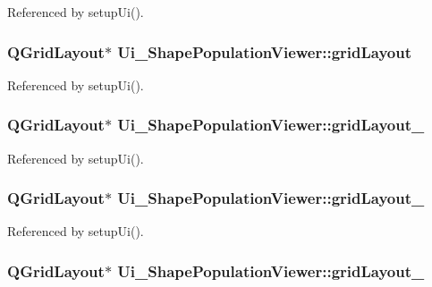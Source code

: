 Referenced by setup\-Ui().

\hypertarget{class_ui___shape_population_viewer_af3bc5541822e536de7b4a80d50d90195}{
\subsubsection[{grid\-Layout}]{\setlength{\rightskip}{0pt plus 5cm}Q\-Grid\-Layout$\ast$ Ui\-\_\-\-Shape\-Population\-Viewer\-::grid\-Layout}}\label{class_ui___shape_population_viewer_af3bc5541822e536de7b4a80d50d90195}


Referenced by setup\-Ui().

\hypertarget{class_ui___shape_population_viewer_a13b301d656b77abbf223d490f24c05f3}{
\subsubsection[{grid\-Layout\-\_\-2}]{\setlength{\rightskip}{0pt plus 5cm}Q\-Grid\-Layout$\ast$ Ui\-\_\-\-Shape\-Population\-Viewer\-::grid\-Layout\-\_}}\label{class_ui___shape_population_viewer_a13b301d656b77abbf223d490f24c05f3}


Referenced by setup\-Ui().

\hypertarget{class_ui___shape_population_viewer_aa31e5757e3798f9648485c7f48eb3d85}{
\subsubsection[{grid\-Layout\-\_\-3}]{\setlength{\rightskip}{0pt plus 5cm}Q\-Grid\-Layout$\ast$ Ui\-\_\-\-Shape\-Population\-Viewer\-::grid\-Layout\-\_}}\label{class_ui___shape_population_viewer_aa31e5757e3798f9648485c7f48eb3d85}


Referenced by setup\-Ui().

\hypertarget{class_ui___shape_population_viewer_a23ea5087f7f5c64a93f0f73f0272e143}{
\subsubsection[{grid\-Layout\-\_\-5}]{\setlength{\rightskip}{0pt plus 5cm}Q\-Grid\-Layout$\ast$ Ui\-\_\-\-Shape\-Population\-Viewer\-::grid\-Layout\-\_}}\label{class_ui___shape_population_viewer_a23ea5087f7f5c64a93f0f73f0272e143}


